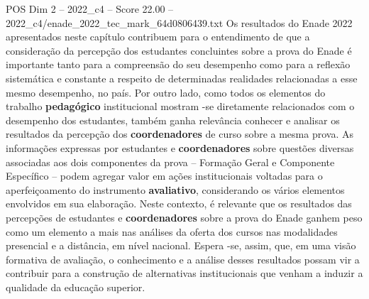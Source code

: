 \begin{textsample}{POS Dim 2 – 2022\_c4 – Score 22.00 – 2022\_c4/enade\_2022\_tec\_mark\_64d0806439.txt}
Os resultados do Enade 2022 apresentados neste capítulo contribuem para o entendimento de que a consideração da percepção dos estudantes concluintes sobre a prova do Enade é importante tanto para a compreensão do seu desempenho como para a reflexão sistemática e constante a respeito de determinadas realidades relacionadas a esse mesmo desempenho, no país.
Por outro lado, como todos os elementos do trabalho \textbf{pedagógico} institucional mostram -se diretamente relacionados com o desempenho dos estudantes, também ganha relevância conhecer e analisar os resultados da percepção dos \textbf{coordenadores} de curso sobre a mesma prova.
As informações expressas por estudantes e \textbf{coordenadores} sobre questões diversas associadas aos dois componentes da prova – Formação Geral e Componente Específico – podem agregar valor em ações institucionais voltadas para o aperfeiçoamento do instrumento \textbf{avaliativo}, considerando os vários elementos envolvidos em sua elaboração.
Neste contexto, é relevante que os resultados das percepções de estudantes e \textbf{coordenadores} sobre a prova do Enade ganhem peso como um elemento a mais nas análises da oferta dos cursos nas modalidades presencial e a distância, em nível nacional.
Espera -se, assim, que, em uma visão formativa de avaliação, o conhecimento e a análise desses resultados possam vir a contribuir para a construção de alternativas institucionais que venham a induzir a qualidade da educação superior.

\end{textsample}
